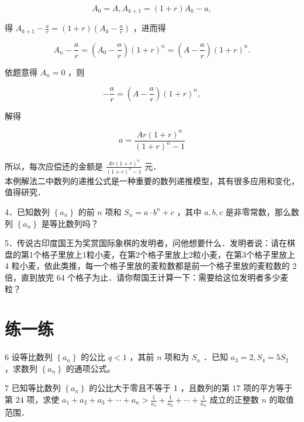 \documentclass[10pt]{article}
\begin{document}
\[
A_{0}=A, A_{k+1}=(1+r) A_{k}-a,
\]

得 \(A_{k+1}-\frac{a}{r}=(1+r)\left(A_{k}-\frac{a}{r}\right)\) ，进而得

\[
A_{n}-\frac{a}{r}=\left(A_{0}-\frac{a}{r}\right)(1+r)^{n}=\left(A-\frac{a}{r}\right)(1+r)^{n} .
\]

依题意得 \(A_{n}=0\) ，则

\[
-\frac{a}{r}=\left(A-\frac{a}{r}\right)(1+r)^{n},
\]

解得

\[
a=\frac{A r(1+r)^{n}}{(1+r)^{n}-1}
\]

所以，每次应偿还的金额是 \(\frac{A r(1+r)^{n}}{(1+r)^{n}-1}\) 元．\\
本例解法二中数列的递推公式是一种重要的数列递推模型，其有很多应用和变化，值得研究．

4．已知数列 \(\left\{a_{n}\right\}\) 的前 \(n\) 项和 \(S_{n}=a \cdot b^{n}+c\) ，其中 \(a, b, c\) 是非零常数，那么数列 \(\left\{a_{n}\right\}\) 是等比数列吗？

5．传说古印度国王为奖赏国际象棋的发明者，问他想要什么．发明者说：请在棋盘的第1个格子里放上1粒小麦，在第2个格子里放上2粒小麦，在第3个格子里放上 4 粒小麦，依此类推，每一个格子里放的麦粒数都是前一个格子里放的麦粒数的 2 倍，直到放完 64 个格子为止．请你帮国王计算一下：需要给这位发明者多少麦粒？

\section*{练一练}
6 设等比数列 \(\left\{a_{n}\right\}\) 的公比 \(q<1\) ，其前 \(n\) 项和为 \(S_{n}\) ．已知 \(a_{3}=2, S_{4}=5 S_{2}\) ，求数列 \(\left\{a_{n}\right\}\) 的通项公式。

7 已知等比数列 \(\left\{a_{n}\right\}\) 的公比大于零且不等于 1 ，且数列的第 17 项的平方等于第 24 项，求使 \(a_{1}+a_{2}+a_{3}+\cdots+a_{n}>\frac{1}{a_{1}}+\frac{1}{a_{2}}+\cdots+\frac{1}{a_{n}}\) 成立的正整数 \(n\) 的取值范围．
\end{document}
